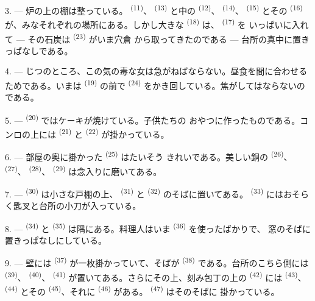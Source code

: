 3. --- 炉の上の棚は整っている。 \textsuperscript{(11)}、
 \textsuperscript{(13)} と中の \textsuperscript{(12)}、
 \textsuperscript{(14)}、 \textsuperscript{(15)} とその
 \textsuperscript{(16)} が、みなそれぞれの場所にある。しかし大きな
 \textsuperscript{(18)} は、 \textsuperscript{(17)} を
いっぱいに入れて --- その石炭は \textsuperscript{(23)} がいま穴倉
から取ってきたのである --- 台所の真中に置きっぱなしである。

4. --- じつのところ、この気の毒な女は急がねばならない。昼食を間に合わせる
ためである。いまは \textsuperscript{(19)} の前で
\textsuperscript{(24)} をかき回している。焦がしてはならないのである。

5. ---  \textsuperscript{(20)} ではケーキが焼けている。子供たちの
おやつに作ったものである。コンロの上には \textsuperscript{(21)} と
 \textsuperscript{(22)} が掛かっている。

\VUsaut{4.0mm}
\VUsaut{3.0mm}

6. --- 部屋の奥に掛かった \textsuperscript{(25)} はたいそう
きれいである。美しい銅の \textsuperscript{(26)}、
\textsuperscript{(27)}、 \textsuperscript{(28)}、
\textsuperscript{(29)} は念入りに磨いてある。

7. ---  \textsuperscript{(30)} は小さな戸棚の上、
\textsuperscript{(31)} と \textsuperscript{(32)} のそばに置いてある。
 \textsuperscript{(33)} にはおそらく匙叉と台所の小刀が入っている。

8. ---  \textsuperscript{(34)} と \textsuperscript{(35)}
は隅にある。料理人はいま \textsuperscript{(36)} を使ったばかりで、
窓のそばに置きっぱなしにしている。

9. --- 壁には \textsuperscript{(37)} が一枚掛かっていて、そばが
 \textsuperscript{(38)} である。台所のこちら側には
\textsuperscript{(39)}、 \textsuperscript{(40)}、
\textsuperscript{(41)} が置いてある。さらにその上、刻み包丁の上の
\textsuperscript{(42)} には \textsuperscript{(43)}、
\textsuperscript{(44)} とその \textsuperscript{(45)}、それに
\textsuperscript{(46)} がある。 \textsuperscript{(47)} はそのそばに
掛かっている。

